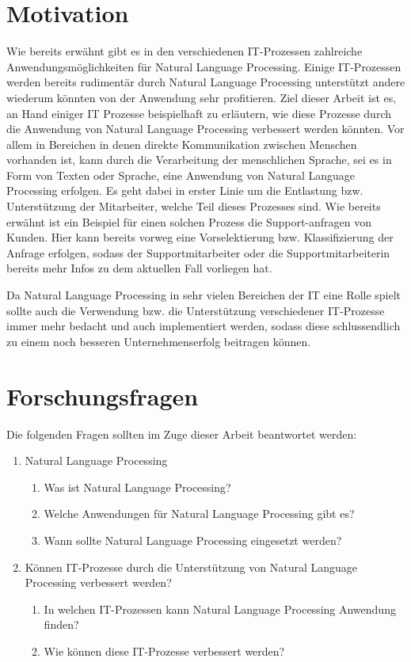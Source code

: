 \documentclass[a4paper]{scrartcl}
\begin{document}
\section{Motivation}
Wie bereits erwähnt gibt es in den verschiedenen IT-Prozessen zahlreiche Anwendungsmöglichkeiten für Natural Language Processing. Einige IT-Prozessen werden bereits rudimentär durch Natural Language Processing unterstützt andere wiederum könnten von der Anwendung sehr profitieren. Ziel dieser Arbeit ist es, an Hand einiger IT Prozesse beispielhaft zu erläutern, wie diese Prozesse durch die Anwendung von Natural Language Processing verbessert werden könnten. Vor allem in Bereichen in denen direkte Kommunikation zwischen Menschen vorhanden ist, kann durch die Verarbeitung der menschlichen Sprache, sei es in Form von Texten oder Sprache, eine Anwendung von Natural Language Processing erfolgen. Es geht dabei in erster Linie um die Entlastung bzw. Unterstützung der Mitarbeiter, welche Teil dieses Prozesses sind. Wie bereits erwähnt ist ein Beispiel für einen solchen Prozess die Support-anfragen von Kunden. Hier kann bereits vorweg eine Vorselektierung bzw. Klassifizierung der Anfrage erfolgen, sodass der Supportmitarbeiter oder die Supportmitarbeiterin bereits mehr Infos zu dem aktuellen Fall vorliegen hat. 

Da Natural Language Processing in sehr vielen Bereichen der IT eine Rolle spielt sollte auch die Verwendung bzw. die Unterstützung verschiedener IT-Prozesse immer mehr bedacht und auch implementiert werden, sodass diese schlussendlich zu einem noch besseren Unternehmenserfolg beitragen können.

\section{Forschungsfragen}
Die folgenden Fragen sollten im Zuge dieser Arbeit beantwortet werden:

\begin{enumerate}
	\item Natural Language Processing \cite{Jurafsky2008} \cite{Manning1999}
	\begin{enumerate}
			\item Was ist Natural Language Processing?
			\item Welche Anwendungen für Natural Language Processing gibt es?
			\item Wann sollte Natural Language Processing eingesetzt werden?
	\end{enumerate}
	\item Können IT-Prozesse durch die Unterstützung von Natural Language Processing verbessert werden? \cite{Huber2009}
	\begin{enumerate}
			\item In welchen IT-Prozessen kann Natural Language Processing Anwendung finden?
			\item Wie können diese IT-Prozesse verbessert werden?
	\end{enumerate}
\end{enumerate}
\end{document}
